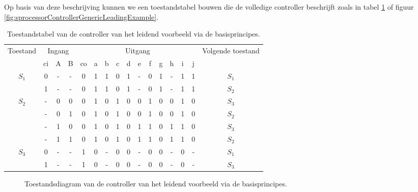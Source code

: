 Op basis van deze beschrijving kunnen we een toestandstabel bouwen die de volledige controller beschrijft zoals in tabel \ref{tbl:sprocessorControllerGenericLeadingExample} of figuur \ref{fig:sprocessorControllerGenericLeadingExample}.
\begin{table}[hbt]
\centering
\begin{tabular}{c|ccc|ccccccccccc|c}
\multirow{2}{*}{Toestand}&\multicolumn{3}{c|}{Ingang}&\multicolumn{11}{c|}{Uitgang}&\multirow{2}{*}{Volgende toestand}\\
&ci&A&B&co&a&b&c&d&e&f&g&h&i&j&\\\hline
\multirow{2}{*}{$S_1$}
&0&-&-&		0	&1&1	&0&1&-	&0&1&-	&1&1	&$S_1$\\
&1&-&-&		0	&1&1	&0&1&-	&0&1&-	&1&1	&$S_2$\\\hline
\multirow{4}{*}{$S_2$}
&-&0&0&		0	&1&0	&1&0&0	&1&0&0	&1&0	&$S_3$\\
&-&0&1&		0	&1&0	&1&0&0	&1&0&0	&1&0	&$S_2$\\
&-&1&0&		0	&1&0	&1&0&1	&1&0&1	&1&0	&$S_3$\\
&-&1&1&		0	&1&0	&1&0&1	&1&0&1	&1&0	&$S_2$\\\hline
\multirow{2}{*}{$S_3$}
&0&-&-&		1	&0&-	&0&0&-	&0&0&-	&0&-	&$S_1$\\
&1&-&-&		1	&0&-	&0&0&-	&0&0&-	&0&-	&$S_3$\\
\end{tabular}
\caption{Toestandstabel van de controller van het leidend voorbeeld via de basisprincipes.}
\label{tbl:sprocessorControllerGenericLeadingExample}
\end{table}
\begin{figure}[hbt]
\centering
{}
\caption{Toestandsdiagram van de controller van het leidend voorbeeld via de basisprincipes.}
\end{figure}
